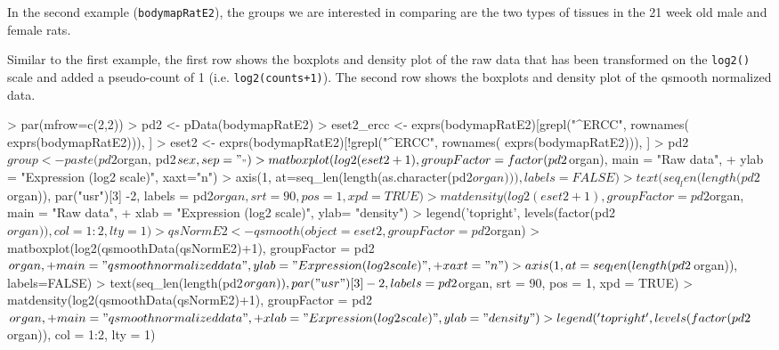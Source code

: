 \documentclass{article}
\begin{document}
In the second example (\texttt{bodymapRatE2}), the groups we
are interested in comparing are the two types of tissues in
the 21 week old male and female rats.

Similar to the first example, the first row shows the boxplots
and density plot of the raw data that has been transformed on
the \texttt{log2()} scale and added a pseudo-count of 1
(i.e. \texttt{log2(counts+1)}). The second row shows the boxplots
and density plot of the qsmooth normalized data.

\begin{Schunk}
\begin{Sinput}
> par(mfrow=c(2,2))
> pd2 <- pData(bodymapRatE2)
> eset2_ercc <- exprs(bodymapRatE2)[grepl("^ERCC", rownames( exprs(bodymapRatE2))), ]
> eset2 <- exprs(bodymapRatE2)[!grepl("^ERCC", rownames( exprs(bodymapRatE2))), ]
> pd2$group <- paste(pd2$organ, pd2$sex, sep="_")
> matboxplot(log2(eset2+1), groupFactor = factor(pd2$organ), main = "Raw data",
+            ylab = "Expression (log2 scale)", xaxt="n")
> axis(1, at=seq_len(length(as.character(pd2$organ))), labels=FALSE)
> text(seq_len(length(pd2$organ)), par("usr")[3] -2, labels = pd2$organ, srt = 90, pos = 1, xpd = TRUE)
> matdensity(log2(eset2+1), groupFactor = pd2$organ, main = "Raw data",
+            xlab = "Expression (log2 scale)", ylab= "density")
> legend('topright', levels(factor(pd2$organ)), col = 1:2, lty = 1)
> qsNormE2 <- qsmooth(object = eset2, groupFactor = pd2$organ)
> matboxplot(log2(qsmoothData(qsNormE2)+1), groupFactor = pd2$organ,
+            main = "qsmooth normalized data", ylab = "Expression (log2 scale)",
+            xaxt="n")
> axis(1, at=seq_len(length(pd2$organ)), labels=FALSE)
> text(seq_len(length(pd2$organ)), par("usr")[3] -2, labels = pd2$organ, srt = 90, pos = 1, xpd = TRUE)
> matdensity(log2(qsmoothData(qsNormE2)+1), groupFactor = pd2$organ,
+            main = "qsmooth normalized data",
+            xlab = "Expression (log2 scale)", ylab = "density")
> legend('topright', levels(factor(pd2$organ)), col = 1:2, lty = 1)
\end{Sinput}
\end{Schunk}
\end{document}
